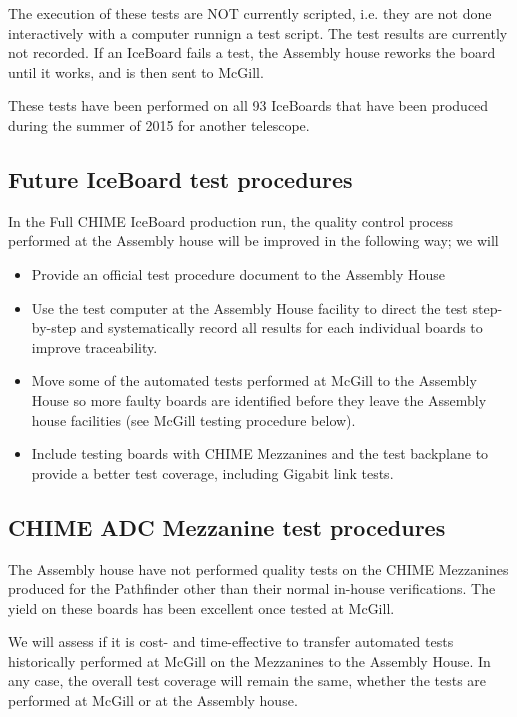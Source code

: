 \documentclass[11pt,article]{memoir}
\begin{document}
The execution of these tests are NOT currently scripted, i.e. they are not
done interactively with a computer runnign a test script. The test results are
currently not recorded. If an IceBoard fails a test, the Assembly house
reworks the board until it works, and is then sent to McGill.

These tests have been performed on all 93 IceBoards that have been produced
during the summer of 2015 for another telescope.


\subsection{Future IceBoard test procedures}

In the Full CHIME IceBoard production run, the quality control process
performed at the Assembly house will be improved in the following way; we will

\begin{itemize}
	\item Provide an official test procedure document to the Assembly House

	\item Use the test computer at the Assembly House facility to direct the
	test step-by-step and systematically record all results for each
	individual boards to improve traceability.

	\item Move some of the automated tests performed at McGill to the Assembly
	House so more faulty boards are identified before they leave the Assembly
	house facilities (see McGill testing procedure below).

	\item Include testing boards with CHIME Mezzanines and the test backplane
	to provide a better test coverage, including Gigabit link tests.
\end{itemize}

\subsection{CHIME ADC Mezzanine test procedures}
The Assembly house have not performed quality tests on the CHIME Mezzanines
produced for the Pathfinder other than their normal in-house verifications.
The yield on these boards has been excellent once tested at McGill.

We will assess if it is cost- and time-effective to transfer automated tests
historically performed at McGill on the Mezzanines to the Assembly House. In
any case, the overall test coverage will remain the same, whether the tests
are performed at McGill or at the Assembly house.
\end{document}
